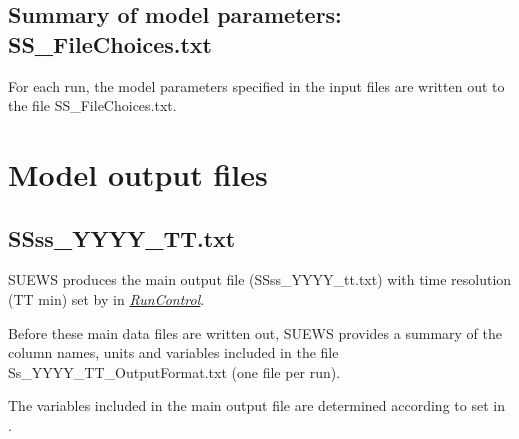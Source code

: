 \documentclass[letterpaper,10pt,english]{sphinxmanual}
\begin{document}
\subsection{Summary of model parameters: SS\_FileChoices.txt}
\label{\detokenize{output_files/output_files:summary-of-model-parameters-ss-filechoices-txt}}
For each run, the model parameters specified in the input files are
written out to the file SS\_FileChoices.txt.


\section{Model output files}
\label{\detokenize{output_files/output_files:model-output-files}}

\subsection{SSss\_YYYY\_TT.txt}
\label{\detokenize{output_files/output_files:ssss-yyyy-tt-txt}}
SUEWS produces the main output file (SSss\_YYYY\_tt.txt) with time
resolution (TT min) set by  in
{\hyperref[\detokenize{output_files/output_files:RunControl}]{\emph{RunControl}}}.

Before these main data files are written out, SUEWS provides a summary
of the column names, units and variables included in the file
Ss\_YYYY\_TT\_OutputFormat.txt (one file per run).

The variables included in the main output file are determined according
to {\hyperref[\detokenize{input_files/RunControl/File_related_options:cmdoption-arg-writeoutoption}]{}} set in {\hyperref[\detokenize{input_files/RunControl/RunControl:runcontrol-nml}]{}}.
\end{document}
